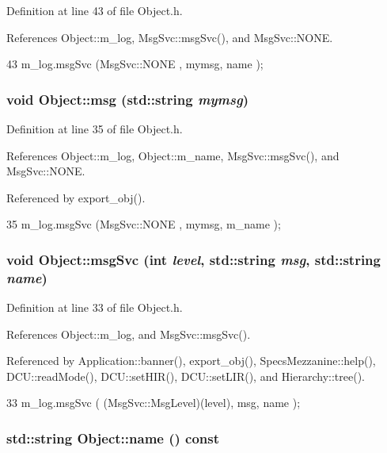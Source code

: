 Definition at line 43 of file Object.h.

References Object::m\_\-log, MsgSvc::msgSvc(), and MsgSvc::NONE.


\begin{DoxyCode}
43 { m_log.msgSvc (MsgSvc::NONE    , mymsg, name ); }
\end{DoxyCode}
\hypertarget{classObject_a58b2d0618c2d08cf2383012611528d97}{
\subsubsection[{msg}]{\setlength{\rightskip}{0pt plus 5cm}void Object::msg (std::string {\em mymsg})}}
\label{classObject_a58b2d0618c2d08cf2383012611528d97}


Definition at line 35 of file Object.h.

References Object::m\_\-log, Object::m\_\-name, MsgSvc::msgSvc(), and MsgSvc::NONE.

Referenced by export\_\-obj().


\begin{DoxyCode}
35 { m_log.msgSvc (MsgSvc::NONE    , mymsg, m_name ); }
\end{DoxyCode}
\hypertarget{classObject_a3f9d5537ebce0c0f2bf6ae4d92426f3c}{
\subsubsection[{msgSvc}]{\setlength{\rightskip}{0pt plus 5cm}void Object::msgSvc (int {\em level}, \/  std::string {\em msg}, \/  std::string {\em name})}}
\label{classObject_a3f9d5537ebce0c0f2bf6ae4d92426f3c}


Definition at line 33 of file Object.h.

References Object::m\_\-log, and MsgSvc::msgSvc().

Referenced by Application::banner(), export\_\-obj(), SpecsMezzanine::help(), DCU::readMode(), DCU::setHIR(), DCU::setLIR(), and Hierarchy::tree().


\begin{DoxyCode}
33 { m_log.msgSvc ( (MsgSvc::MsgLevel)(level), msg, name ); }
\end{DoxyCode}
\hypertarget{classObject_a975e888d50bfcbffda2c86368332a5cd}{
\subsubsection[{name}]{\setlength{\rightskip}{0pt plus 5cm}std::string Object::name () const}}
\label{classObject_a975e888d50bfcbffda2c86368332a5cd}


